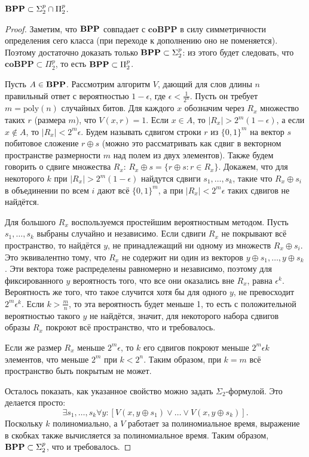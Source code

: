 \begin{theorem}
$\textbf{BPP} \subset \Sigma_2^p \cap \Pi_2^p$.
\end{theorem}

\begin{proof}
Заметим, что $\textbf{BPP}$ совпадает с $\mathbf{coBPP}$ в силу симметричности определения сего класса (при переходе к дополнению оно не поменяется). Поэтому достаточно доказать только $\textbf{BPP} \subset \Sigma_2^p$: из этого будет следовать, что $\mathbf{coBPP} \subset \Pi_2^p$, то есть $\textbf{BPP} \subset \Pi_2^p$.

Пусть $A \in \textbf{BPP}$. Рассмотрим алгоритм $V$, дающий для слов длины $n$ правильный ответ с вероятностью $1 - \epsilon$, где $\epsilon < \frac{1}{2^n}$. Пусть он требует $m = \mathrm{poly}(n)$ случайных битов. Для каждого $x$ обозначим через $R_x$ множество таких $r$ (размера $m$), что $V(x, r) = 1$. Если $x \in A$, то $|R_x| > 2^m(1-\epsilon)$, а если $x \not\in A$, то $|R_x| < 2^m\epsilon$. Будем называть сдвигом строки $r$ из $\{0, 1\}^m$ на вектор $s$ побитовое сложение $r \oplus s$ (можно это рассматривать как сдвиг в векторном пространстве размерности $m$ над полем из двух элементов). Также будем говорить о сдвиге множества $R_x$: $R_x \oplus s = \{r \oplus s\colon r \in R_x\}$. Докажем, что для некоторого $k$ при $|R_x| > 2^m(1-\epsilon)$ найдутся сдвиги $s_1, \ldots, s_k$, такие что $R_x \oplus s_i$ в объединении по всем $i$ дают всё $\{0, 1\}^m$, а при $|R_x| < 2^m\epsilon$ таких сдвигов не найдётся.

Для большого $R_x$ воспользуемся простейшим вероятностным методом. Пусть $s_1, \ldots, s_k$ выбраны случайно и независимо. Если сдвиги $R_x$ не покрывают всё пространство, то найдётся $y$, не принадлежащий ни одному из множеств $R_x \oplus s_i$. Это эквивалентно тому, что $R_x$ не содержит ни один из векторов $y \oplus s_1, \ldots, y \oplus s_k$. Эти вектора тоже распределены равномерно и независимо, поэтому для фиксированного $y$ вероятность того, что все они оказались вне $R_x$, равна $\epsilon^k$. Вероятность же того, что такое случится хотя бы для одного $y$, не превосходит $2^m \epsilon^k$. Если $k > \frac{m}{n}$, то эта вероятность будет меньше 1, то есть с положительной вероятностью такого $y$ не найдётся, значит, для некоторого набора сдвигов образы $R_x$ покроют всё пространство, что и требовалось.

Если же размер $R_x$ меньше $2^m\epsilon$, то $k$ его сдвигов покроют меньше $2^m\epsilon k$ элементов, что меньше $2^m$ при $k < 2^n$. Таким образом, при $k = m$ всё пространство быть покрытым не может.

Осталось показать, как указанное свойство можно задать $\Sigma_2$-формулой. Это делается просто:
\[
\exists s_1,\ldots, s_k \forall y\colon \left[V(x, y \oplus s_1) \vee \ldots \vee V(x, y \oplus s_k) \right].
\]
Поскольку $k$ полиномиально, а $V$ работает за полиномиальное время, выражение в скобках также вычисляется за полиномиальное время. Таким образом, $\textbf{BPP} \subset \Sigma_2^p$, что и требовалось.
\end{proof}